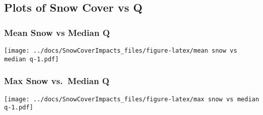 \documentclass[]{article}
\begin{document}
\hypertarget{plots-of-snow-cover-vs-q}{%
\subsection{Plots of Snow Cover vs Q}\label{plots-of-snow-cover-vs-q}}

\hypertarget{mean-snow-vs-median-q}{%
\subsubsection{Mean Snow vs Median Q}\label{mean-snow-vs-median-q}}

\texttt{[image: ../docs/SnowCoverImpacts\_files/figure-latex/mean snow vs median q-1.pdf]}

\hypertarget{max-snow-vs.median-q}{%
\subsubsection{Max Snow vs.~Median Q}\label{max-snow-vs.median-q}}

\texttt{[image: ../docs/SnowCoverImpacts\_files/figure-latex/max snow vs median q-1.pdf]}
\end{document}
